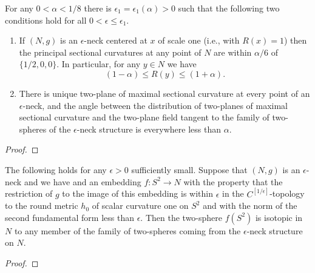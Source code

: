 \begin{lemma}
\label{lem:epsilon-neck-curvature-pinching}
\label{neckcurv}

For any $0<\alpha<1/8$  there is $\epsilon_1=\epsilon_1(\alpha)>0$ such that
the following two conditions hold for all $0<\epsilon\le \epsilon_1$.
\begin{enumerate} \item[(1)] If $(N,g)$ is an $\epsilon$-neck centered at $x$ of
scale one (i.e., with $R(x)=1$) then the principal sectional
curvatures at any point of $N$ are within $\alpha/6$ of
$\{1/2,0,0\}$. In particular, for any $y\in N$ we have
$$(1-\alpha)\le R(y)\le (1+\alpha).$$
\item[(2)] There is unique two-plane of maximal sectional curvature at
every point of an $\epsilon$-neck, and the angle between the
distribution of two-planes of maximal sectional curvature and the
two-plane field tangent to the family of two-spheres of the
$\epsilon$-neck structure is everywhere less than $\alpha$.
\end{enumerate}
\end{lemma}

\begin{proof}
\sketch
\end{proof}


\begin{corollary}
\label{cor:embedded-sphere-isotopic-to-neck-fiber}
\label{s2isotopic}

The following holds for any $\epsilon>0$ sufficiently small. Suppose
that $(N,g)$ is an $\epsilon$-neck and we have  and an embedding
$f\colon S^2 \to N$ with the property that the restriction of $g$ to
the image of this embedding is within $\epsilon$ in the
$C^{[1/\epsilon]}$-topology to the round metric $h_0$ of scalar
curvature one on $S^2$ and with the norm of the second fundamental
form less than $\epsilon$. Then the two-sphere $f(S^2)$ is isotopic
in $N$ to any member of the family of two-spheres coming from the
$\epsilon$-neck structure on $N$.
\end{corollary}



\begin{proof}
\sketch
{}
\end{proof}


